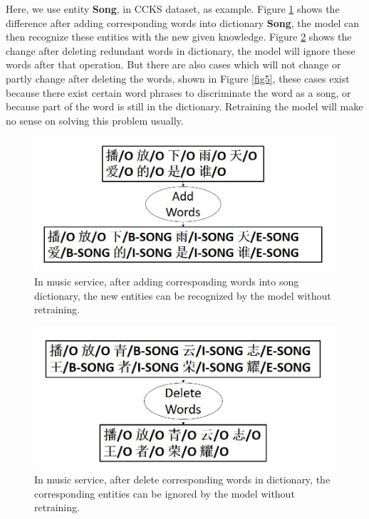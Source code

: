 \documentclass[letterpaper]{article} %
\begin{document}
Here, we use entity \textbf{Song}, in CCKS dataset, as example. Figure \ref{fig3} shows the difference after adding corresponding words into dictionary \textbf{Song}, the model can then recognize these entities with the new given knowledge. Figure \ref {fig4} shows the change after deleting redundant words in dictionary, the model will ignore these words after that operation. But there are also cases which will not change or partly change after deleting the words, shown in Figure \ref{fig5},  these cases exist because there exist certain word phrases to discriminate the word as a song,  or because part of the word is still in the dictionary. Retraining the model will make no sense on solving this problem usually.

\begin{figure}[t]
\centering
\includegraphics[width=0.9\columnwidth]{change_after_adding_song} %
\caption{In music service, after adding corresponding words into song dictionary, the new entities can be recognized by the model without retraining.}
\label{fig3}
\end{figure}

\begin{figure}[t]
\centering
\includegraphics[width=0.85\columnwidth]{change_after_delete_song} %
\caption{In music service, after delete corresponding words in dictionary, the corresponding entities can be ignored by the model without retraining.}
\label{fig4}
\end{figure}
\end{document}
